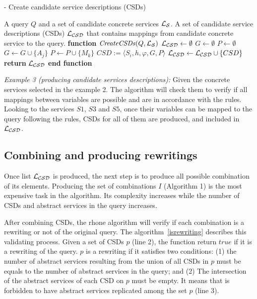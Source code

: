 \begin{algorithm}
\caption{ - Create candidate service descriptions (CSDs)}
\label{creatingcsds}
\begin{algorithmic}[1]
\REQUIRE A query $Q$ and a set of candidate concrete services $\hbox{${\cal L_{S}}$}$.
\ENSURE A set of candidate service descriptions (CSDs) $\hbox{${\cal L_{CSD}}$}$ that contains mappings from candidate concrete service to the query.
\STATE \textbf{function} $\mathit{CreateCSDs} (Q, \hbox{${\cal L_{S}}$})$
\STATE $\hbox{${\cal L_{CSD}}$} \leftarrow \emptyset$
		\STATE $G \leftarrow \emptyset$	
		\STATE $P \leftarrow \emptyset$		
			\STATE $G \leftarrow G \cup \lbrace A_{j} \rbrace$ 
		\ENDFOR
			\STATE $P \leftarrow P \cup \lbrace M_{k} \rbrace$ 
		\ENDFOR
		\STATE $CSD := \langle S_{i}, h, \varphi, G, P \rangle$	
		\STATE $\hbox{${\cal L_{CSD}}$} \leftarrow \hbox{${\cal L_{CSD}}$} \cup \lbrace CSD \rbrace$	
	\ENDIF
\ENDFOR
\STATE \textbf{return} $\hbox{${\cal L_{CSD}}$}$
\STATE \textbf{end function}
\end{algorithmic}
\end{algorithm}

\bigskip
\noindent \textit{Example 3 (producing candidate services descriptions):} 
Given the concrete services selected in the example 2. The algorithm will check them to 
verify if all mappings between variables are possible and are in accordance with the rules. 
Looking to the services $S1$, $S3$ and $S5$, once their variables can be mapped to the
query following the rules, CSDs for all of them are produced, and included in $\hbox{${\cal L_{CSD}}$}$.


\subsection{Combining and producing rewritings}
Once list $\hbox{${\cal L_{CSD}}$}$ is produced, the next step is to produce all possible 
combination of its elements. Producing the set of combinations $I$ (Algorithm 1)
is the most expensive task in the algorithm. Its complexity increases while
the number of CSDs and abstract services in the query increases.

After combining CSDs, the rhone algorithm will verify if each combination
is a rewriting or not of the original query. The algorithm~\ref{isrewriting}
describes this validating process. Given a set of CSDs $p$ (line 2), the function 
return $true$ if it is a rewriting of the query. $p$ is a rewriting if it satisfies
two conditions: (1) the number of abstract services resulting from the union of all 
CSDs in $p$ must be equals to the number of abstract services in the query; and (2)
The intersection of the abstract services of each CSD on $p$ must be empty. 
It means that is forbidden to have abstract services replicated among the set $p$ (line 3).

